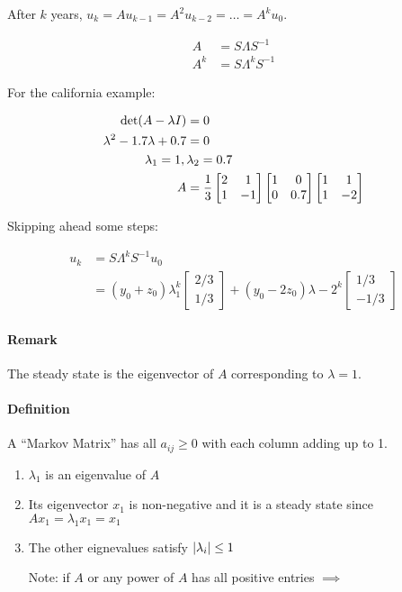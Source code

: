 After $k$ years, $u_k = Au_{k-1} = A^2 u_{k-2} = \dots = A^k u_0$.

\begin{align*}
  A &= S \Lambda S^{-1} \\
  A^k &= S \Lambda^k S^{-1}
\end{align*}

For the california example:

\begin{align*}
  \det(A - \lambda I)           &= 0\\
  \lambda^2 - 1.7 \lambda + 0.7 &= 0\\
  \lambda_1 = 1,\,& \lambda_2 = 0.7\\ 
  A &=
  {1 \over 3}
  \begin{bmatrix}
    2 & 1 \\ 1 & -1
  \end{bmatrix}
  \begin{bmatrix}
    1 & 0 \\ 0 & 0.7
  \end{bmatrix}
  \begin{bmatrix}
    1 & 1 \\ 1 & -2
  \end{bmatrix}
\end{align*}

Skipping ahead some steps:

\begin{align*}
  u_k &= S \Lambda^k S^{-1}u_0 \\
      &= (y_0 + z_0) \lambda_1^k
      \begin{bmatrix}
        {2 / 3} \\ {1 / 3}
      \end{bmatrix} +
      (y_0 - 2z_0) \lambda-2^k
      \begin{bmatrix}
        {1 / 3} \\ -{1 / 3}
      \end{bmatrix}
\end{align*}

\paragraph{Remark} The steady state is the eigenvector of $A$ corresponding to $\lambda = 1$.

\paragraph{Definition} A ``Markov Matrix'' has all $a_{ij} \geq 0$ with each column adding up to 1.
\begin{enumerate}
  \renewcommand{\theenumi}{\roman{enumi}}
  \item $\lambda_1$ is an eigenvalue of $A$
  \item Its eigenvector $x_1$ is non-negative and it is a steady state since $Ax_1 = \lambda_1 x_1 = x_1$ 
  \item The other eignevalues satisfy $\left|\lambda_i\right| \leq 1$

  Note: if $A$ or any power of $A$ has all positive entries $\implies$
\end{enumerate}

